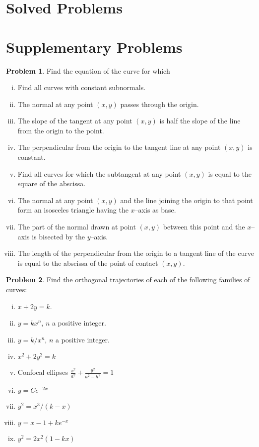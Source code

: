 \documentclass{scrartcl}
\theoremstyle{definition}
\newtheorem{problem}{Problem}
\begin{document}
\section*{Solved Problems}


\section*{Supplementary Problems}
\begin{problem}
Find the equation of the curve for which
\begin{enumerate}[(i)]
	\item Find all curves with constant subnormals.
	\item The normal at any point $(x,y)$ passes through the origin.
	\item The slope of the tangent at any point $(x,y)$ is half the slope of the line from the origin to the point.
	\item The perpendicular from the origin to the tangent line at any point $(x,y)$ is constant.
	\item Find all curves for which the subtangent at any point $(x,y)$ is equal to the square of the abscissa.
	\item The normal at any point $(x,y)$ and the line joining the origin to that point form an isosceles triangle having the $x$--axis as base.
	\item The part of the normal drawn at point $(x,y)$ between this point and the $x$--axis is bisected by the $y$--axis.
	\item The length of the perpendicular from the origin to a tangent line of the curve is equal to the abscissa of the point of contact $(x,y)$.
\end{enumerate}
\end{problem}

\begin{problem}
Find the orthogonal trajectories of each of the following families of
curves: 
\begin{multicols}{2}
\begin{enumerate}[(i)]
	\item $x+2y=k$.
	\item $y=kx^n$, $n$ a positive integer.
	\item $y=k/x^n$, $n$ a positive integer.
	\item $x^2+2y^2=k$
	\item Confocal ellipses $\tfrac{x^2}{a^2}+\tfrac{y^2}{a^2-h^2}=1$
	\item $y=Ce^{-2x}$
	\item $y^2 = x^3/(k-x)$
	\item $y=x-1+ke^{-x}$
	\item $y^2 = 2x^2(1-kx)$
\end{enumerate}
\end{multicols}
\end{problem}
\end{document}
